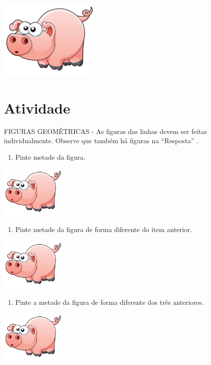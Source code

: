 \documentclass[a4,12pt]{book}
\begin{document}
\includegraphics[width=\textwidth,height=4cm, keepaspectratio]{pig}
\section{Atividade}






\begin{imagem*}[breakable]{}{}   FIGURAS GEOMÉTRICAS - As figuras das linhas devem ser feitas individualmente. Observe que também há figuras na   ``Resposta''  .
\end{imagem*}
\begin{enumerate} [\quad a)] %
  \item     Pinte metade da figura.
\end{enumerate} %
\mbox{} \newline  \includegraphics[width=90pt, keepaspectratio]{pig}
\begin{enumerate} [\quad a)] %
  \item     Pinte metade da figura de forma diferente do item anterior.
\end{enumerate} %
\mbox{} \newline  \includegraphics[width=90pt, keepaspectratio]{pig}
\begin{enumerate} [\quad a)] %
  \item     Pinte a metade da figura de forma diferente dos três anteriores.
\end{enumerate} %
\mbox{} \newline  \includegraphics[width=90pt, keepaspectratio]{pig}
\end{document}
